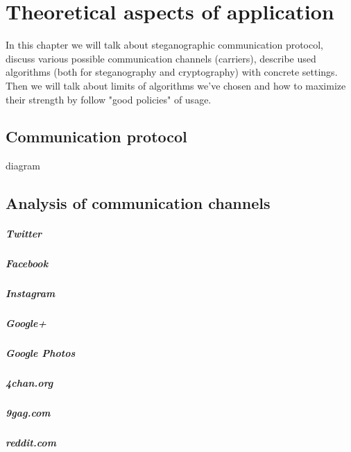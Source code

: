 \chapter{Theoretical aspects of application}

In this chapter we will talk about steganographic communication protocol,
discuss various possible communication channels (carriers), describe
used algorithms (both for steganography and cryptography) with concrete
settings. Then we will talk about limits of algorithms we've chosen and
how to maximize their strength by follow "good policies" of usage.

\section{Communication protocol}

\TODO diagram

\section{Analysis of communication channels}

\paragraph{Twitter}
\paragraph{Facebook}
\paragraph{Instagram}
\paragraph{Google+}
\paragraph{Google Photos}
\paragraph{4chan.org}
\paragraph{9gag.com}
\paragraph{reddit.com}



